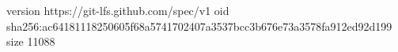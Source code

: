 version https://git-lfs.github.com/spec/v1
oid sha256:ac64181118250605f68a5741702407a3537bcc3b676e73a3578fa912ed92d199
size 11088
